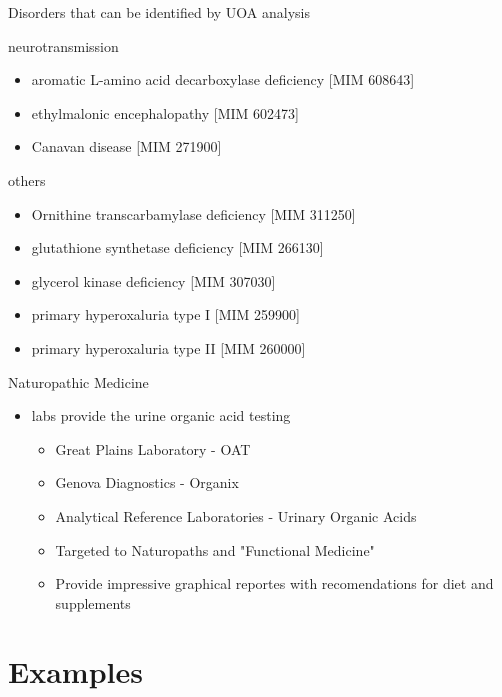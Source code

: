 \documentclass[presentation, smaller]{beamer}
\begin{document}
\begin{frame}[label={sec:orgheadline13}]{Disorders that can be identified by UOA analysis}
\begin{block}{neurotransmission}
\begin{itemize}
\item aromatic L-amino acid decarboxylase deficiency [MIM 608643]
\item ethylmalonic encephalopathy [MIM 602473]
\item Canavan disease [MIM 271900]
\end{itemize}
\end{block}
\begin{block}{others}
\begin{itemize}
\item Ornithine transcarbamylase deficiency [MIM 311250]
\item glutathione synthetase deficiency [MIM 266130]
\item glycerol kinase deficiency [MIM 307030]
\item primary hyperoxaluria type I [MIM 259900]
\item primary hyperoxaluria type II [MIM 260000]
\end{itemize}
\end{block}
\end{frame}


\begin{frame}[label={sec:orgheadline14}]{Naturopathic Medicine}
\begin{itemize}
\item labs provide the urine organic acid testing 
\begin{itemize}
\item Great Plains Laboratory - OAT
\item Genova Diagnostics - Organix
\item Analytical Reference Laboratories - Urinary Organic Acids

\item Targeted to Naturopaths and  "Functional Medicine"
\item Provide impressive graphical reportes with recomendations for diet and supplements
\end{itemize}
\end{itemize}
\end{frame}

\section{Examples}
\label{sec:orgheadline22}
\end{document}
